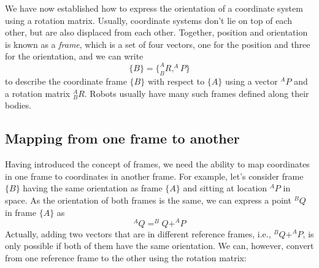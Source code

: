 We have now established how to express the orientation of a coordinate system using a rotation matrix. Usually, coordinate systems don't lie on top of each other, but are also displaced from each other.
Together, position and orientation is known as a \emph{frame}, which is a set of four vectors, one for the position and three for the orientation, and we can write
%
\begin{equation}
\{B\}=\{^A_BR, ^AP\}
\end{equation}
%
to describe the coordinate frame $\{B\}$ with respect to $\{A\}$ using a vector $^AP$ and a rotation matrix $^A_BR$. Robots usually have many such frames defined along their bodies.

\subsection{Mapping from one frame to another}
Having introduced the concept of frames, we need the ability to map coordinates in one frame to coordinates in another frame. For example, let's consider frame $\{B\}$ having the same orientation as frame $\{A\}$ and sitting at location $^AP$ in space. As the orientation of both frames is the same, we can express a point $ ^BQ$ in frame $\{A\}$ as
%
\begin{equation}
^AQ=^BQ+^AP
\end{equation}
%
Actually, adding two vectors that are in different reference frames, i.e., $ ^BQ+^AP$, is only possible if both of them have the same orientation. We can, however, convert from one reference frame to the other using the rotation matrix:

